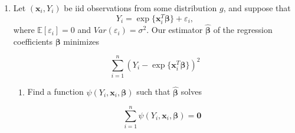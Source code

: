 \documentclass[11pt]{article}
\begin{document}
\begin{enumerate}
\begin{enumerate}
\item Show that $\mathbb{E}\left(|Y_i - \mu|\right) = \sigma \sqrt{2/\pi}$, so $\widehat{\sigma}_2$ is a reasonable estimator for $\sigma$.

\item  Show that $\boldsymbol{\theta}_0 = (\mu, \sigma)^T$.

\item We have previously shown that $\sqrt{n}(\widehat{\sigma}_1^2 - \sigma^2) \overset{d}{\to} N(0, 2 \sigma^4)$. Using this information, find the asymptotic distribution of $\sqrt{n}(\widehat{\sigma}_1 - \sigma)$.

\item Using results for M-estimators, find the asymptotic distribution of $\sqrt{n}(\widehat{\boldsymbol{\theta}} - \boldsymbol{\theta}_0)$. For this part of the problem you may use, without proof, the following fact: 

$$\mathbb{E}(|Y_i - \theta_1|) = \sigma \sqrt{\frac{2}{\pi}} \ \exp \left\lbrace -\frac{1}{2\sigma^2} (\theta_1 - \mu)^2 \right\rbrace + (\mu - \theta_1)(1 - F(\theta_1)) + (\theta_1 - \mu)F(\theta_1)$$

where $F$ is the cdf of the $N(\mu, \sigma^2)$ distribution.

\item Find the asymptotic relative efficiency $ARE(\widehat{\sigma}_1, \widehat{\sigma}_2)$.

\end{enumerate}

\bigskip

\item Let $(\mathbf{x}_i, Y_i)$ be iid observations from some distribution $g$, and suppose that
$$Y_i = \exp\{\mathbf{x}_i^T \boldsymbol{\beta}\} + \varepsilon_i,$$
where $\mathbb{E}[\varepsilon_i] = 0$ and $Var(\varepsilon_i) = \sigma^2$. Our estimator $\widehat{\boldsymbol{\beta}}$ of the regression coefficients $\boldsymbol{\beta}$ minimizes

$$\sum \limits_{i=1}^n (Y_i - \exp\{\mathbf{x}_i^T \boldsymbol{\beta}\})^2$$

\begin{enumerate}
\item Find a function $\psi(Y_i, \mathbf{x}_i, \boldsymbol{\beta})$ such that $\widehat{\boldsymbol{\beta}}$ solves

$$\sum \limits_{i=1}^n \psi(Y_i, \mathbf{x}_i, \boldsymbol{\beta}) = \boldsymbol{0}$$


\end{enumerate}
\end{enumerate}
\end{document}
